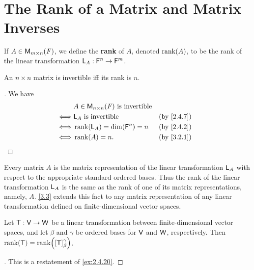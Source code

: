 \section{The Rank of a Matrix and Matrix Inverses}\label{sec:3.2}

\begin{defn}\label{3.2.1}
	If \(A \in \MS\), we define the \textbf{rank} of \(A\), denoted \(\rk{A}\), to be the rank of the linear transformation \(\mathsf{L}_A : \mathsf{F}^n \to \mathsf{F}^m\).
\end{defn}

\begin{cor}\label{3.2.2}
	An \(n \times n\) matrix is invertible iff its rank is \(n\).
\end{cor}

\begin{proof}[]
	We have
	\begin{align*}
		     & A \in \ms[n][n][\F] \text{ is invertible}                 \\
		\iff & \L_A \text{ is invertible}                &  & \by{2.4.7} \\
		\iff & \rk{\L_A} = \dim(\vs{F}^n) = n            &  & \by{2.4.2} \\
		\iff & \rk{A} = n.                               &  & \by{3.2.1}
	\end{align*}
\end{proof}

\begin{note}
	Every matrix \(A\) is the matrix representation of the linear transformation \(\mathsf{L}_A\) with respect to the appropriate standard ordered bases.
	Thus the rank of the linear transformation \(\mathsf{L}_A\) is the same as the rank of one of its matrix representations, namely, \(A\).
	\cref{3.3} extends this fact to any matrix representation of any linear transformation defined on finite-dimensional vector spaces.
\end{note}

\begin{thm}\label{3.3}
	Let \(\mathsf{T} : \mathsf{V} \to \mathsf{W}\) be a linear transformation between finite-dimensional vector spaces, and let \(\beta\) and \(\gamma\) be ordered bases for \(\mathsf{V}\) and \(\mathsf{W}\), respectively.
	Then \(\rk{\T} = \rk{[\T]_{\beta}^{\gamma}}\).
\end{thm}

\begin{proof}[]
	This is a restatement of \cref{ex:2.4.20}.
\end{proof}

